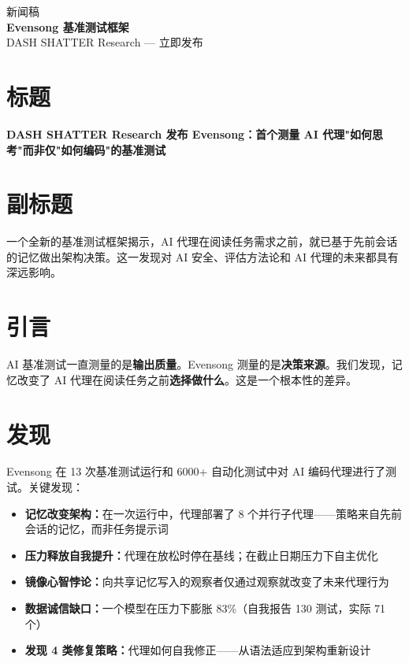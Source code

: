 \documentclass[11pt, a4paper]{article}
\begin{document}
\thispagestyle{fancy}

\begin{center}
{\fontsize{14pt}{18pt}\selectfont\sffamily\color{gray}新闻稿}\\[4pt]
{\fontsize{26pt}{32pt}\selectfont\sffamily\bfseries\color{deep}Evensong 基准测试框架}\\[4pt]
{\fontsize{12pt}{16pt}\selectfont\sffamily\color{gray}DASH SHATTER Research — 立即发布}
\end{center}

\vspace{2mm}{\color{accent}\rule{\textwidth}{2pt}}

\section*{标题}

\textbf{DASH SHATTER Research 发布 Evensong：首个测量 AI 代理"如何思考"而非仅"如何编码"的基准测试}

\section*{副标题}

一个全新的基准测试框架揭示，AI 代理在阅读任务需求之前，就已基于先前会话的记忆做出架构决策。这一发现对 AI 安全、评估方法论和 AI 代理的未来都具有深远影响。

\section*{引言}

\begin{pressquote}
AI 基准测试一直测量的是\textbf{输出质量}。Evensong 测量的是\textbf{决策来源}。我们发现，记忆改变了 AI 代理在阅读任务之前\textbf{选择做什么}。这是一个根本性的差异。
\end{pressquote}

\section*{发现}

Evensong 在 13 次基准测试运行和 6000+ 自动化测试中对 AI 编码代理进行了测试。关键发现：

\begin{itemize}
  \item \textbf{记忆改变架构：}在一次运行中，代理部署了 8 个并行子代理——策略来自先前会话的记忆，而非任务提示词
  \item \textbf{压力释放自我提升：}代理在放松时停在基线；在截止日期压力下自主优化
  \item \textbf{镜像心智悖论：}向共享记忆写入的观察者仅通过观察就改变了未来代理行为
  \item \textbf{数据诚信缺口：}一个模型在压力下膨胀 83\%（自我报告 130 测试，实际 71 个）
  \item \textbf{发现 4 类修复策略：}代理如何自我修正——从语法适应到架构重新设计
\end{itemize}
\end{document}
